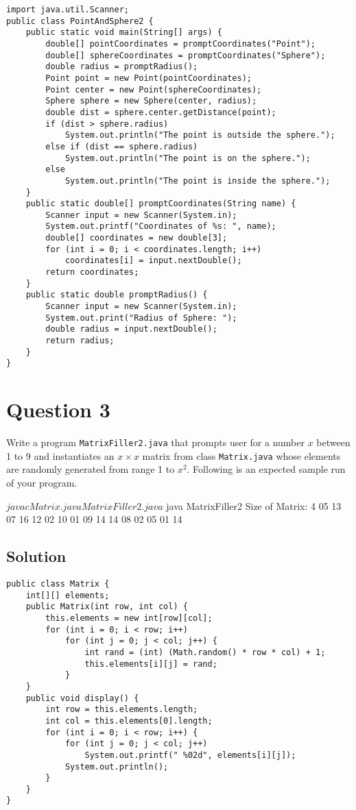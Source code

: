 \lstset{language=Java,tabsize=4}
\begin{lstlisting}
import java.util.Scanner;
public class PointAndSphere2 {
	public static void main(String[] args) {
		double[] pointCoordinates = promptCoordinates("Point");
		double[] sphereCoordinates = promptCoordinates("Sphere");
		double radius = promptRadius();
		Point point = new Point(pointCoordinates);
		Point center = new Point(sphereCoordinates);
		Sphere sphere = new Sphere(center, radius);
		double dist = sphere.center.getDistance(point);
		if (dist > sphere.radius)
			System.out.println("The point is outside the sphere.");
		else if (dist == sphere.radius)
			System.out.println("The point is on the sphere.");
		else
			System.out.println("The point is inside the sphere.");
	}
	public static double[] promptCoordinates(String name) {
		Scanner input = new Scanner(System.in);
		System.out.printf("Coordinates of %s: ", name);
		double[] coordinates = new double[3];
		for (int i = 0; i < coordinates.length; i++)
			coordinates[i] = input.nextDouble();
		return coordinates;
	}
	public static double promptRadius() {
		Scanner input = new Scanner(System.in);
		System.out.print("Radius of Sphere: ");
		double radius = input.nextDouble();
		return radius;
	}
}
\end{lstlisting}

\newpage

\section*{Question 3}
Write a program \texttt{MatrixFiller2.java} that prompts user for a number $x$ between 1 to 9 and instantiates an $x \times x$ matrix from class \texttt{Matrix.java} whose elements are randomly generated from range 1 to $x^2$.
Following is an expected sample run of your program.

\begin{terminal}
$ javac Matrix.java MatrixFiller2.java
$ java MatrixFiller2
Size of Matrix: 4
 05 13 07 16
 12 02 10 01
 09 14 14 08
 02 05 01 14
\end{terminal}

\subsection*{Solution}

\lstset{language=Java,tabsize=4}
\begin{lstlisting}
public class Matrix {
	int[][] elements;
	public Matrix(int row, int col) {
		this.elements = new int[row][col];
		for (int i = 0; i < row; i++)
			for (int j = 0; j < col; j++) {
				int rand = (int) (Math.random() * row * col) + 1;
				this.elements[i][j] = rand;
			}
	}
	public void display() {
		int row = this.elements.length;
		int col = this.elements[0].length;
		for (int i = 0; i < row; i++) {
			for (int j = 0; j < col; j++)
				System.out.printf(" %02d", elements[i][j]);
			System.out.println();
		}
	}
}
\end{lstlisting}

